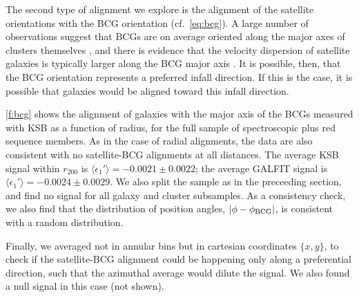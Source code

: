 The second type of alignment we explore is the alignment of the satellite orientations with the BCG 
orientation (cf.\ \cref{eq:bcg}). A large number of observations suggest that BCGs are on 
average oriented along the major axes of clusters themselves 
\citep[e.g.,][]{sastry68,binggeli82,faltenbacher07_alignment,niederste10,hao11}, and there is evidence that 
the velocity dispersion of satellite galaxies is typically larger along the BCG major axis 
\citep{skielboe12}. It is possible, then, that the BCG orientation represents a preferred infall 
direction. If this is the case, it is possible that galaxies would be aligned toward this infall 
direction.

\cref{f:bcg} shows the alignment of galaxies with the major axis of the BCGs measured with KSB as a 
function of radius, for the full sample of spectroscopic plus red sequence members. As in the case 
of radial alignments, the data are also consistent with no satellite-BCG alignments at all 
distances. The average KSB signal within $r_{200}$ is $\langle\epsilon_1'\rangle=-0.0021\pm0.0022$; 
the average GALFIT signal is $\langle\epsilon_1'\rangle=-0.0024\pm0.0029$. We also split the sample 
as in the preceeding section, and find no signal for all galaxy and cluster subsamples. As a 
consistency check, we also find that the distribution of position angles, $\lvert\phi-\phi_{\rm 
BCG}\rvert$, is consistent with a random distribution.

Finally, we averaged not in annular bins but in cartesian coordinates $\{x,y\}$, to check if the 
satellite-BCG alignment could be happening only along a preferential direction, such that the 
azimuthal average would dilute the signal. We also found a null signal in this case (not shown).

